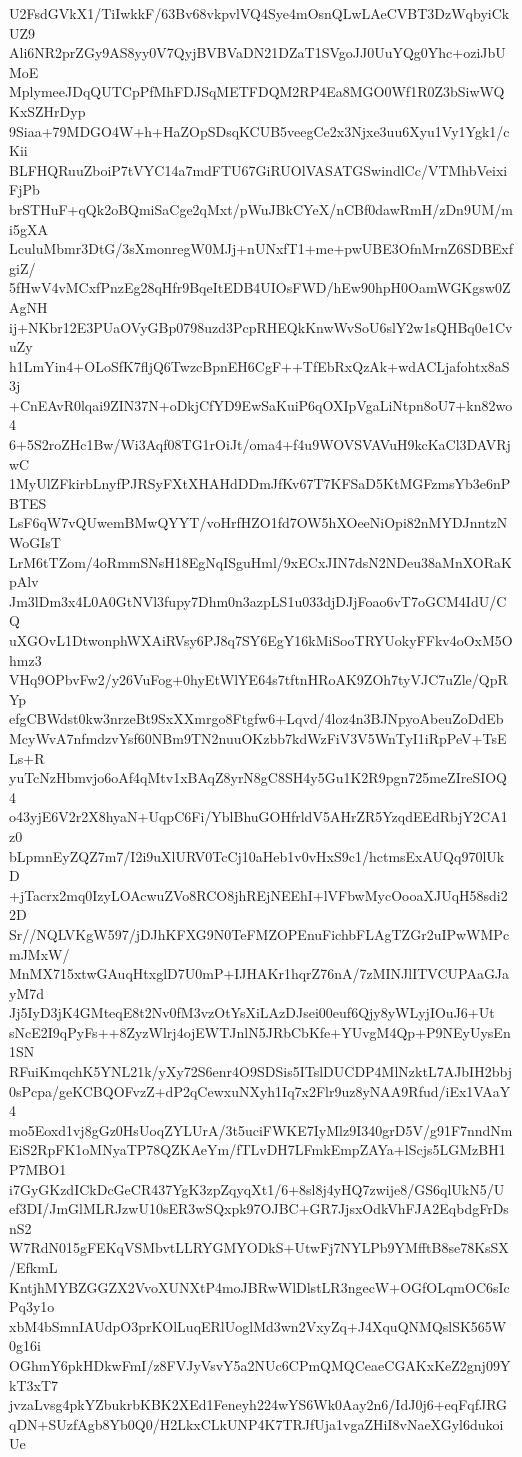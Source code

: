U2FsdGVkX1/TiIwkkF/63Bv68vkpvlVQ4Sye4mOsnQLwLAeCVBT3DzWqbyiCkUZ9
Ali6NR2prZGy9AS8yy0V7QyjBVBVaDN21DZaT1SVgoJJ0UuYQg0Yhc+oziJbUMoE
MplymeeJDqQUTCpPfMhFDJSqMETFDQM2RP4Ea8MGO0Wf1R0Z3bSiwWQKxSZHrDyp
9Siaa+79MDGO4W+h+HaZOpSDsqKCUB5veegCe2x3Njxe3uu6Xyu1Vy1Ygk1/cKii
BLFHQRuuZboiP7tVYC14a7mdFTU67GiRUOlVASATGSwindlCc/VTMhbVeixiFjPb
brSTHuF+qQk2oBQmiSaCge2qMxt/pWuJBkCYeX/nCBf0dawRmH/zDn9UM/mi5gXA
LculuMbmr3DtG/3sXmonregW0MJj+nUNxfT1+me+pwUBE3OfnMrnZ6SDBExfgiZ/
5fHwV4vMCxfPnzEg28qHfr9BqeItEDB4UIOsFWD/hEw90hpH0OamWGKgsw0ZAgNH
ij+NKbr12E3PUaOVyGBp0798uzd3PcpRHEQkKnwWvSoU6slY2w1sQHBq0e1CvuZy
h1LmYin4+OLoSfK7fljQ6TwzcBpnEH6CgF++TfEbRxQzAk+wdACLjafohtx8aS3j
+CnEAvR0lqai9ZIN37N+oDkjCfYD9EwSaKuiP6qOXIpVgaLiNtpn8oU7+kn82wo4
6+5S2roZHc1Bw/Wi3Aqf08TG1rOiJt/oma4+f4u9WOVSVAVuH9kcKaCl3DAVRjwC
1MyUlZFkirbLnyfPJRSyFXtXHAHdDDmJfKv67T7KFSaD5KtMGFzmsYb3e6nPBTES
LsF6qW7vQUwemBMwQYYT/voHrfHZO1fd7OW5hXOeeNiOpi82nMYDJnntzNWoGIsT
LrM6tTZom/4oRmmSNsH18EgNqISguHml/9xECxJIN7dsN2NDeu38aMnXORaKpAlv
Jm3lDm3x4L0A0GtNVl3fupy7Dhm0n3azpLS1u033djDJjFoao6vT7oGCM4IdU/CQ
uXGOvL1DtwonphWXAiRVsy6PJ8q7SY6EgY16kMiSooTRYUokyFFkv4oOxM5Ohmz3
VHq9OPbvFw2/y26VuFog+0hyEtWlYE64s7tftnHRoAK9ZOh7tyVJC7uZle/QpRYp
efgCBWdst0kw3nrzeBt9SxXXmrgo8Ftgfw6+Lqvd/4loz4n3BJNpyoAbeuZoDdEb
McyWvA7nfmdzvYsf60NBm9TN2nuuOKzbb7kdWzFiV3V5WnTyI1iRpPeV+TsELs+R
yuTcNzHbmvjo6oAf4qMtv1xBAqZ8yrN8gC8SH4y5Gu1K2R9pgn725meZIreSIOQ4
o43yjE6V2r2X8hyaN+UqpC6Fi/YblBhuGOHfrldV5AHrZR5YzqdEEdRbjY2CA1z0
bLpmnEyZQZ7m7/I2i9uXlURV0TcCj10aHeb1v0vHxS9c1/hctmsExAUQq970lUkD
+jTacrx2mq0IzyLOAcwuZVo8RCO8jhREjNEEhI+lVFbwMycOooaXJUqH58sdi22D
Sr//NQLVKgW597/jDJhKFXG9N0TeFMZOPEnuFichbFLAgTZGr2uIPwWMPcmJMxW/
MnMX715xtwGAuqHtxglD7U0mP+IJHAKr1hqrZ76nA/7zMINJlITVCUPAaGJayM7d
Jj5IyD3jK4GMteqE8t2Nv0fM3vzOtYsXiLAzDJsei00euf6Qjy8yWLyjIOuJ6+Ut
sNcE2I9qPyFs++8ZyzWlrj4ojEWTJnlN5JRbCbKfe+YUvgM4Qp+P9NEyUysEn1SN
RFuiKmqchK5YNL21k/yXy72S6enr4O9SDSis5ITslDUCDP4MlNzktL7AJbIH2bbj
0sPcpa/geKCBQOFvzZ+dP2qCewxuNXyh1Iq7x2Flr9uz8yNAA9Rfud/iEx1VAaY4
mo5Eoxd1vj8gGz0HsUoqZYLUrA/3t5uciFWKE7IyMlz9I340grD5V/g91F7nndNm
EiS2RpFK1oMNyaTP78QZKAeYm/fTLvDH7LFmkEmpZAYa+lScjs5LGMzBH1P7MBO1
i7GyGKzdICkDcGeCR437YgK3zpZqyqXt1/6+8sl8j4yHQ7zwije8/GS6qlUkN5/U
ef3DI/JmGlMLRJzwU10sER3wSQxpk97OJBC+GR7JjsxOdkVhFJA2EqbdgFrDsnS2
W7RdN015gFEKqVSMbvtLLRYGMYODkS+UtwFj7NYLPb9YMfftB8se78KsSX/EfkmL
KntjhMYBZGGZX2VvoXUNXtP4moJBRwWlDlstLR3ngecW+OGfOLqmOC6sIcPq3y1o
xbM4bSmnIAUdpO3prKOlLuqERlUoglMd3wn2VxyZq+J4XquQNMQslSK565W0g16i
OGhmY6pkHDkwFmI/z8FVJyVsvY5a2NUc6CPmQMQCeaeCGAKxKeZ2gnj09YkT3xT7
jvzaLvsg4pkYZbukrbKBK2XEd1Feneyh224wYS6Wk0Aay2n6/IdJ0j6+eqFqfJRG
qDN+SUzfAgb8Yb0Q0/H2LkxCLkUNP4K7TRJfUja1vgaZHiI8vNaeXGyl6dukoiUe
